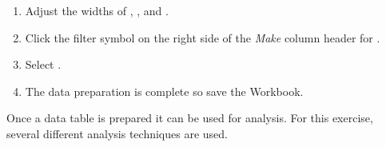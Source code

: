 \begin{enumerate}[resume]
\begin{enumerate}
	\end{enumerate}

	\item Adjust the widths of , , and .
	\item Click the filter symbol on the right side of the \textit{Make} column header for .
	\item Select .
	\item The data preparation is complete so save the Workbook.

\end{enumerate}

Once a data table is prepared it can be used for analysis. For this exercise, several different analysis techniques are used.


